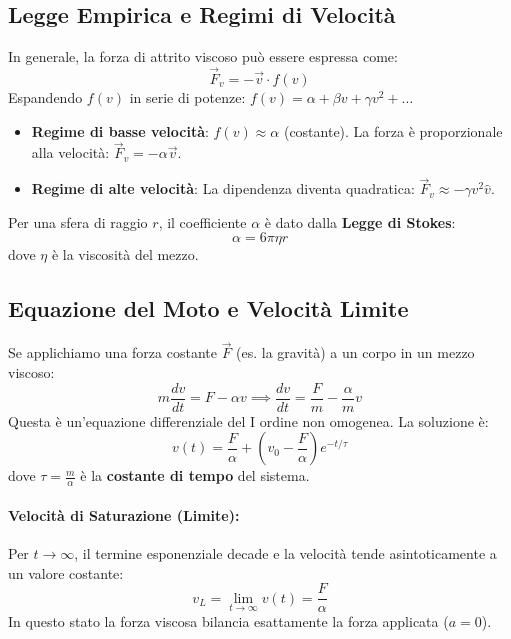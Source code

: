 \subsection{Legge Empirica e Regimi di Velocità}
In generale, la forza di attrito viscoso può essere espressa come:
\begin{equation}
    \vec{F}_v = -\vec{v} \cdot f(v)
\end{equation}
Espandendo $f(v)$ in serie di potenze: $f(v) = \alpha + \beta v + \gamma v^2 + \dots$
\begin{itemize}
    \item \textbf{Regime di basse velocità}: $f(v) \approx \alpha$ (costante). La forza è proporzionale alla velocità: $\vec{F}_v = -\alpha \vec{v}$.
    \item \textbf{Regime di alte velocità}: La dipendenza diventa quadratica: $\vec{F}_v \approx -\gamma v^2 \hat{v}$.
\end{itemize}

Per una sfera di raggio $r$, il coefficiente $\alpha$ è dato dalla \textbf{Legge di Stokes}:
\begin{equation}
    \alpha = 6 \pi \eta r
\end{equation}
dove $\eta$ è la viscosità del mezzo.

\subsection{Equazione del Moto e Velocità Limite}
Se applichiamo una forza costante $\vec{F}$ (es. la gravità) a un corpo in un mezzo viscoso:
\begin{equation}
    m \frac{dv}{dt} = F - \alpha v \implies \frac{dv}{dt} = \frac{F}{m} - \frac{\alpha}{m} v
\end{equation}
Questa è un'equazione differenziale del I ordine non omogenea. La soluzione è:
\begin{equation}
    v(t) = \frac{F}{\alpha} + \left( v_0 - \frac{F}{\alpha} \right) e^{-t/\tau}
\end{equation}
dove $\tau = \frac{m}{\alpha}$ è la \textbf{costante di tempo} del sistema.

\paragraph{Velocità di Saturazione (Limite):}
Per $t \to \infty$, il termine esponenziale decade e la velocità tende asintoticamente a un valore costante:
\begin{equation}
    v_L = \lim_{t \to \infty} v(t) = \frac{F}{\alpha}
\end{equation}
In questo stato la forza viscosa bilancia esattamente la forza applicata ($a=0$).

